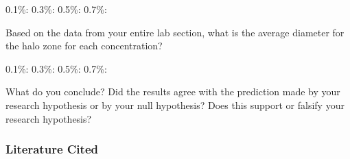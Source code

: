 \documentclass[12pt]{exam}
\begin{document}
\begin{questions}
\vspace*{0.5\baselineskip}

0.1\%: \hfill 0.3\%: \hfill 0.5\%: \hfill 0.7\%: \hfill \phantom{|}

\vspace*{0.5\baselineskip}

\question \label{ques:halo}
Based on the data from your entire lab section, what is the average diameter for the halo zone for each concentration?

\vspace*{0.5\baselineskip}

0.1\%: \hfill 0.3\%: \hfill 0.5\%: \hfill 0.7\%: \hfill \phantom{|}

\vspace*{0.5\baselineskip}

\question
What do you conclude?  Did the results agree with the prediction made by your research hypothesis or by your null hypothesis? Does this support or falsify your research hypothesis?

\vspace*{3\baselineskip}


%
%
%
%	
%		
%
%
%
\end{questions}

\subsubsection*{Literature Cited}
\end{document}
